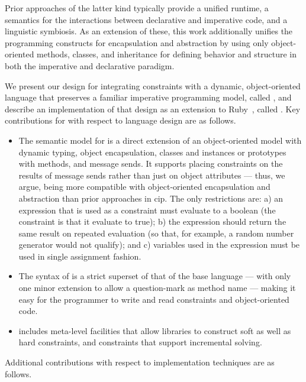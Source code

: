 Prior approaches of the latter kind typically provide a unified
runtime, a semantics for the interactions between declarative and
imperative code, and a linguistic symbiosis. As an extension of these,
this work additionally unifies the programming constructs for
encapsulation and abstraction by using only object-oriented methods,
classes, and inheritance for defining behavior and structure in both
the imperative and declarative paradigm.

We present our design for integrating constraints with a dynamic,
object-oriented language that preserves a familiar imperative
programming model, called \langname, and describe an implementation of
that design as an extension to Ruby~\cite{flanagan2008ruby}, called
\toolname. Key contributions for \langname with respect to language
design are as follows.

\begin{itemize}
\item The semantic model for \langname is a direct extension of an
  object-oriented model with dynamic typing, object encapsulation,
  classes and instances or prototypes with methods, and message sends.
  It supports placing constraints on the results of message sends
  rather than just on object attributes --- thus, we argue, being more
  compatible with object-oriented encapsulation and abstraction than
  prior approaches in \ac{cip}. The only restrictions are: a) an
  expression that is used as a constraint must evaluate to a boolean
  (the constraint is that it evaluate to true); b) the expression should
  return the same result on repeated evaluation (so that, for example, a
  random number generator would not qualify); and c) variables used
  in the expression must be used in single assignment fashion.
\item The syntax of \langname is a strict superset of that of the base
  language --- with only one minor extension to allow a question-mark
  as method name --- making it easy for the programmer to write and
  read constraints and object-oriented code.
\item \langname includes meta-level facilities that allow libraries to
  construct soft as well as hard constraints, and constraints that
  support incremental solving.
\end{itemize}

Additional contributions with respect to implementation techniques are
as follows.


